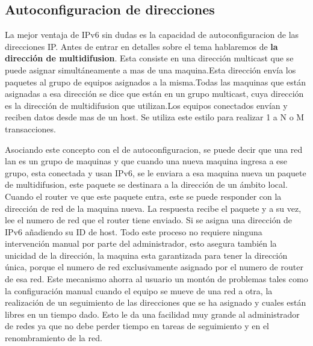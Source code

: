 \documentclass[11pt,a4paper]{article}
\begin{document}
\subsection{Autoconfiguracion de direcciones}
La mejor ventaja de IPv6 sin dudas es la capacidad de autoconfiguracion de las direcciones IP. Antes 
de entrar en detalles sobre el tema hablaremos de \textbf{la dirección de multidifusion}. Esta 
consiste en una dirección multicast que se puede asignar simultáneamente a mas de una maquina.Esta 
dirección envía los paquetes al grupo de equipos asignados a la misma.Todas las maquinas que están 
asignadas a esa dirección se dice que están en un grupo multicast, cuya dirección es la dirección  
de multidifusion que utilizan.Los equipos conectados envían y reciben datos desde mas de un host. Se 
utiliza este estilo para realizar 1 a N o M transacciones.\par
Asociando este concepto con el de autoconfiguracion, se puede decir que una red lan es un grupo de 
maquinas y que cuando una nueva maquina ingresa a ese grupo, esta conectada y usan IPv6, se le 
enviara a esa maquina nueva un paquete de multidifusion, este paquete se destinara a la dirección 
de un ámbito local. Cuando el router ve que este paquete entra, este se puede responder con la 
dirección de red de la maquina nueva. La respuesta recibe el paquete y a su vez, lee el numero de 
red que el router tiene enviado. Si se asigna una dirección de IPv6 añadiendo su ID de host. Todo 
este proceso no requiere ninguna intervención manual por parte del administrador, esto asegura 
también la unicidad de la dirección, la maquina esta garantizada para tener la dirección única, 
porque el numero de red exclusivamente asignado por el numero de router de esa red.
Este mecanismo ahorra al usuario un montón de problemas tales como la configuración manual cuando el 
equipo se mueve de una red a otra, la realización de un seguimiento de las direcciones que se ha 
asignado y cuales están libres en un tiempo dado.
Esto le da una facilidad muy grande al administrador de redes ya que no debe perder tiempo en tareas 
de seguimiento y en el renombramiento de la red.
\end{document}
